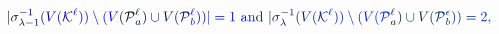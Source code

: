 \documentclass[12pt]{article}
\begin{document}
\makeatletter
\renewcommand*{\@textcolor}[3]{%
  \protect\leavevmode
  \begingroup
    \color#1{#2}#3%
  \endgroup
}
\makeatother
\begin{displaymath}
\mathcolor[RGB]{0,0,15}{|} \mathcolor[RGB]{0,0,30}{\sigma} _ { \mathcolor[RGB]{0,0,45}{\lambda} \mathcolor[RGB]{0,0,60}{-} \mathcolor[RGB]{0,0,75}{1} } ^ { \mathcolor[RGB]{0,0,90}{-} \mathcolor[RGB]{0,0,105}{1} } \mathcolor[RGB]{0,0,120}{(} \mathcolor[RGB]{0,0,135}{V} \mathcolor[RGB]{0,0,150}{(} \mathcal { \mathcolor[RGB]{0,0,165}{K} } ^ { \mathcolor[RGB]{0,0,180}{\ell} } \mathcolor[RGB]{0,0,195}{)} \mathcolor[RGB]{0,0,210}{)} \mathcolor[RGB]{0,0,225}{\setminus} \mathcolor[RGB]{0,0,240}{(} \mathcolor[RGB]{0,0,255}{V} \mathcolor[RGB]{0,15,0}{(} \mathcal { \mathcolor[RGB]{0,15,15}{P} } _ { \mathcolor[RGB]{0,15,30}{a} } ^ { \mathcolor[RGB]{0,15,45}{\ell} } \mathcolor[RGB]{0,15,60}{)} \mathcolor[RGB]{0,15,75}{\cup} \mathcolor[RGB]{0,15,90}{V} \mathcolor[RGB]{0,15,105}{(} \mathcal { \mathcolor[RGB]{0,15,120}{P} } _ { \mathcolor[RGB]{0,15,135}{b} } ^ { \mathcolor[RGB]{0,15,150}{\ell} } \mathcolor[RGB]{0,15,165}{)} \mathcolor[RGB]{0,15,180}{)} \mathcolor[RGB]{0,15,195}{|} \mathcolor[RGB]{0,15,210}{=} \mathcolor[RGB]{0,15,225}{1} \mathrm { ~ \mathcolor[RGB]{0,15,240}{a} \mathcolor[RGB]{0,15,255}{n} \mathcolor[RGB]{0,30,0}{d} ~ } \mathcolor[RGB]{0,30,15}{|} \mathcolor[RGB]{0,30,30}{\sigma} _ { \mathcolor[RGB]{0,30,45}{\lambda} } ^ { \mathcolor[RGB]{0,30,60}{-} \mathcolor[RGB]{0,30,75}{1} } \mathcolor[RGB]{0,30,90}{(} \mathcolor[RGB]{0,30,105}{V} \mathcolor[RGB]{0,30,120}{(} \mathcal { \mathcolor[RGB]{0,30,135}{K} } ^ { \mathcolor[RGB]{0,30,150}{\ell} } \mathcolor[RGB]{0,30,165}{)} \mathcolor[RGB]{0,30,180}{)} \mathcolor[RGB]{0,30,195}{\setminus} \mathcolor[RGB]{0,30,210}{(} \mathcolor[RGB]{0,30,225}{V} \mathcolor[RGB]{0,30,240}{(} \mathcal { \mathcolor[RGB]{0,30,255}{P} } _ { \mathcolor[RGB]{0,45,0}{a} } ^ { \mathcolor[RGB]{0,45,15}{\ell} } \mathcolor[RGB]{0,45,30}{)} \mathcolor[RGB]{0,45,45}{\cup} \mathcolor[RGB]{0,45,60}{V} \mathcolor[RGB]{0,45,75}{(} \mathcal { \mathcolor[RGB]{0,45,90}{P} } _ { \mathcolor[RGB]{0,45,105}{b} } ^ { \mathcolor[RGB]{0,45,120}{\epsilon} } \mathcolor[RGB]{0,45,135}{)} \mathcolor[RGB]{0,45,150}{)} \mathcolor[RGB]{0,45,165}{=} \mathcolor[RGB]{0,45,180}{2} \mathcolor[RGB]{0,45,195}{,}
\end{displaymath}
\end{document}
